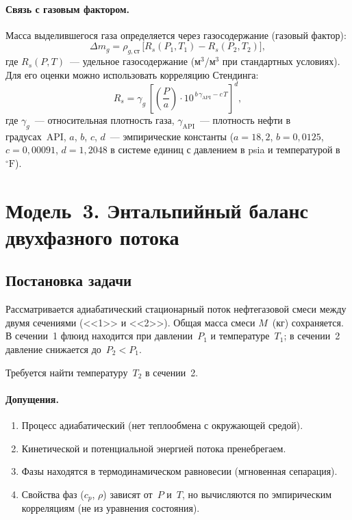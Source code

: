 \documentclass[12pt,a4paper]{article}
\begin{document}
\paragraph{Связь с газовым фактором.}
Масса выделившегося газа определяется через газосодержание (газовый фактор):
\begin{equation}\label{eq:Rs}
  \Delta m_g = \rho_{g,\text{ст}}\,\bigl[R_s(P_1,T_1) - R_s(P_2,T_2)\bigr],
\end{equation}
где $R_s(P,T)$~--- удельное газосодержание (м$^3$/м$^3$ при стандартных условиях).
Для его оценки можно использовать корреляцию Стендинга:
\begin{equation}\label{eq:standing}
  R_s = \gamma_g\,\left[\left(\frac{P}{a}\right)
        \cdot 10^{\,b\,\gamma_{\mathrm{API}} - c\,T}\right]^d,
\end{equation}
где $\gamma_g$~--- относительная плотность газа, $\gamma_{\mathrm{API}}$~---
плотность нефти в градусах~API, $a$, $b$, $c$, $d$~--- эмпирические
константы ($a=18{,}2$, $b=0{,}0125$, $c=0{,}00091$, $d=1{,}2048$ в системе
единиц с давлением в psia и температурой в~${}^\circ\mathrm{F}$).

\section{Модель~3. Энтальпийный баланс двухфазного потока}

\subsection{Постановка задачи}

Рассматривается адиабатический стационарный поток нефтегазовой смеси
между двумя сечениями (<<1>> и <<2>>). Общая масса смеси $M$~(кг) сохраняется.
В сечении~1 флюид находится при давлении~$P_1$ и температуре~$T_1$;
в сечении~2 давление снижается до~$P_2 < P_1$.

Требуется найти температуру~$T_2$ в сечении~2.

\paragraph{Допущения.}
\begin{enumerate}[nosep]
  \item Процесс адиабатический (нет теплообмена с окружающей средой).
  \item Кинетической и потенциальной энергией потока пренебрегаем.
  \item Фазы находятся в термодинамическом равновесии (мгновенная сепарация).
  \item Свойства фаз ($c_p$, $\rho$) зависят от~$P$ и~$T$, но вычисляются
        по эмпирическим корреляциям (не из уравнения состояния).
\end{enumerate}
\end{document}
